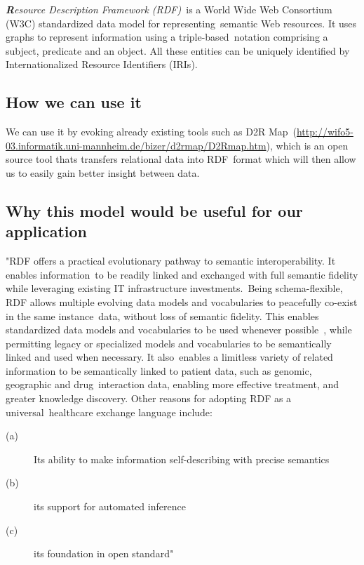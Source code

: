 \documentclass[DIV=calc, paper=a4, fontsize=12pt, onecolumn]{scrartcl}	 %
\newcommand{\initial}[1]{ %
\lettrine[lines=3,lhang=0.3,nindent=0em,slope=0em]{
\color{DarkBlue}
{\textbf{\textit{#1}}}}{}}
\begin{document}
\initial{R}\textit{esource Description Framework (RDF)}\
is a World Wide Web Consortium (W3C) standardized data model for representing\
semantic Web resources. It uses graphs to represent information using a triple-based\
 notation comprising a subject, predicate and an object. All these entities can be uniquely identified by Internationalized Resource Identifiers (IRIs).\
  \citep{pathak_applying_2012}

\subsection{How we can use it}

We can use it by evoking already existing tools such as D2R Map\
  (\url{http://wifo5-03.informatik.uni-mannheim.de/bizer/d2rmap/D2Rmap.htm}),
 which is an open source tool thats transfers relational data into RDF\
 format which will then allow us to easily gain better insight between data.\

\subsection{Why this model would be useful for our application}

"RDF offers a practical evolutionary pathway to semantic interoperability. It enables information\
 to be readily linked and exchanged with full semantic fidelity while leveraging existing IT infrastructure investments.\
 Being schema-flexible, RDF allows multiple evolving data models and vocabularies to peacefully co-exist in the same instance\
data, without loss of semantic fidelity. This enables standardized data models and vocabularies to be used whenever possible\
, while permitting legacy or specialized models and vocabularies to be semantically linked and used when necessary. It also\
 enables a limitless variety of related information to be semantically linked to patient data, such as genomic, geographic and drug\
 interaction data, enabling more effective treatment, and greater knowledge discovery. Other reasons for adopting RDF as a universal\
 healthcare exchange language include:

\begin{description}
\item[(a)]  Its ability to make information self-describing with precise semantics
\item[(b)] its support for automated inference
\item[(c)]  its foundation in open standard"
\end{description}
\end{document}
